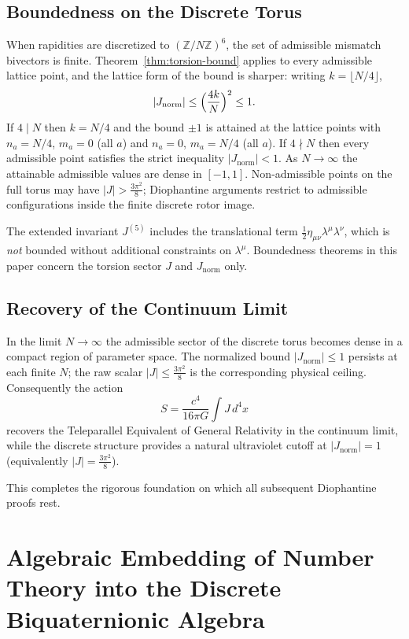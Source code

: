 \documentclass[a4paper]{article}
\theoremstyle{definition}
\theoremstyle{remark}
\newcommand{\Jnorm}{J_{\mathrm{norm}}}
\newcommand{\Jbound}{\frac{3\pi^2}{8}}
\begin{document}
\subsection{Boundedness on the Discrete Torus}

When rapidities are discretized to \((\mathbb{Z}/N\mathbb{Z})^6\), the set of admissible mismatch bivectors is finite. Theorem~\ref{thm:torsion-bound} applies to every admissible lattice point, and the lattice form of the bound is sharper: writing \(k=\lfloor N/4\rfloor\),
\[
|\Jnorm| \leq \Bigl(\frac{4k}{N}\Bigr)^2 \leq 1.
\]
If \(4\mid N\) then \(k=N/4\) and the bound \(\pm 1\) is attained at the lattice points with \(n_a=N/4\), \(m_a=0\) (all \(a\)) and \(n_a=0\), \(m_a=N/4\) (all \(a\)). If \(4\nmid N\) then every admissible point satisfies the strict inequality \(|\Jnorm|<1\). As \(N\to\infty\) the attainable admissible values are dense in \([-1,1]\). Non-admissible points on the full torus may have \(|J| > \Jbound\); Diophantine arguments restrict to admissible configurations inside the finite discrete rotor image.

The extended invariant \(J^{(5)}\) includes the translational term \(\frac12 \eta_{\mu\nu}\lambda^\mu\lambda^\nu\), which is \emph{not} bounded without additional constraints on \(\lambda^\mu\). Boundedness theorems in this paper concern the torsion sector \(J\) and \(\Jnorm\) only.

\subsection{Recovery of the Continuum Limit}

In the limit \( N \to \infty \) the admissible sector of the discrete torus becomes dense in a compact region of parameter space. The normalized bound \(|\Jnorm| \leq 1\) persists at each finite \(N\); the raw scalar \(|J| \leq \Jbound\) is the corresponding physical ceiling. Consequently the action
\[
S = \frac{c^4}{16\pi G} \int J \, d^4x
\]
recovers the Teleparallel Equivalent of General Relativity in the continuum limit, while the discrete structure provides a natural ultraviolet cutoff at \(|\Jnorm| = 1\) (equivalently \(|J| = \Jbound\)).

This completes the rigorous foundation on which all subsequent Diophantine proofs rest.

\section{Algebraic Embedding of Number Theory into the Discrete Biquaternionic Algebra}
\end{document}
